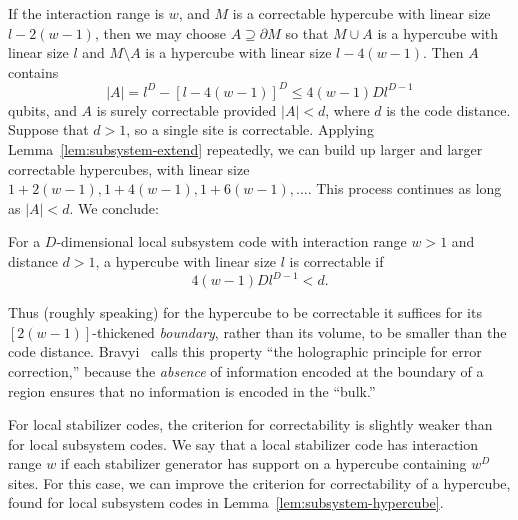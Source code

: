 If the interaction range is $w$, and $M$ is a correctable hypercube with linear size $l-2(w-1)$, 
then we may choose $A\supseteq \partial M$ 
so that $M\cup A$ is a hypercube with linear size $l$ and $M\setminus A$ is a hypercube with linear size $l - 4(w-1)$. 
Then $A$ contains
\[
|A| = l^D - \left[l-4(w-1)\right]^D \le 4(w-1)Dl^{D-1}
\]
qubits, and $A$ is surely correctable provided $|A|<d$, where $d$ is the code distance. 
Suppose that $d>1$, so a single site is correctable. 
Applying Lemma~\ref{lem:subsystem-extend} repeatedly,
we can build up larger and larger correctable hypercubes,
with linear size $1 + 2(w-1), 1+ 4(w-1), 1+ 6(w-1), \dots$. 
This process continues as long as $|A|< d$. We conclude:

\begin{lem}
\label{lem:subsystem-hypercube}
For a $D$-dimensional local subsystem code with interaction range $w>1$ and distance $d>1 $, 
a hypercube with linear size $l$ is correctable if 
\begin{equation}\label{eq:hypercube-size}
4(w-1)Dl^{D-1} < d.
\end{equation}
\end{lem}

\noindent Thus (roughly speaking) for the hypercube to be correctable 
it suffices for its $\left[2(w-1)\right]$-thickened \emph{boundary}, 
rather than its volume, to be smaller than the code distance. 
Bravyi~\cite{Bravyi2010Subsystem} calls this property ``the holographic principle for error correction,''
because the \emph{absence} of information encoded at the boundary of a region 
ensures that no information is encoded in the ``bulk.'' 

For local stabilizer codes, the criterion for correctability is slightly weaker than for local subsystem codes.
We say that a local stabilizer code has interaction range $w$
if each stabilizer generator has support on a hypercube containing $w^D$ sites.
For this case, we can improve the criterion for correctability of a hypercube,
found for local subsystem codes in Lemma~\ref{lem:subsystem-hypercube}.


